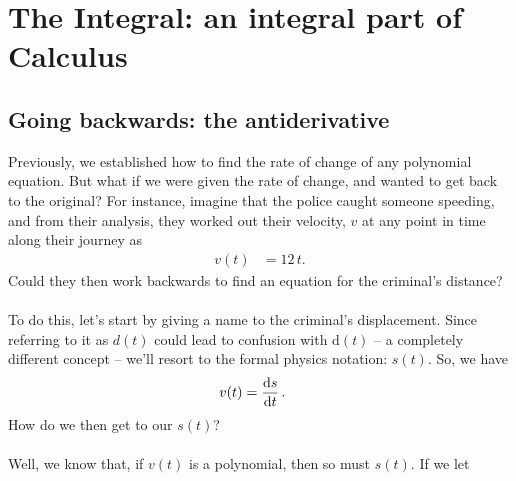 \documentclass[11pt, leqno]{article}
\numberwithin{equation}{section}
\begin{document}
\section{The Integral: an integral part of Calculus}
\subsection{Going backwards: the antiderivative}
Previously, we established how to find the rate of change of any polynomial equation. But what if we were given the rate of change, and wanted to get back to the original? For instance, imagine that the police caught someone speeding, and from their analysis, they worked out their velocity, \(v\) at any point in time along their journey as
\begin{align*}
	v(t) &= 12 \, t.
\end{align*} 
Could they then work backwards to find an equation for the criminal's distance? 
\\ \\ To do this, let's start by giving a name to the criminal's displacement. Since referring to it as \(d(t)\) could lead to confusion with \(\text{d}(t)\) -- a completely different concept -- we'll resort to the formal physics notation: \(s(t)\). So, we have
\begin{align*}
v(t) &= \frac{ \mathop{\text{d}s} }{ \mathop{\text{d}t} } \, .
\end{align*}
How do we then get to our \(s(t)\)? 
\\ \\ Well, we know that, if \(v(t)\) is a polynomial, then so must \(s(t)\). If we let 
\end{document}
